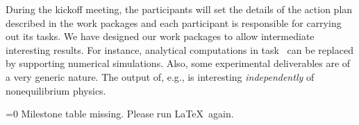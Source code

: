 During the kickoff meeting, the participants will set the details of the action plan
described in the work packages and each participant is responsible for carrying out its
tasks.
%
We have designed our work packages to allow intermediate interesting results. For instance,
analytical computations in task~ can be replaced by
supporting numerical simulations.
%
Also, some experimental deliverables are of a very generic nature. The output of, e.g.,
 is interesting {\em independently} of nonequilibrium
physics.

\makeatletter
\ifnum{}=0
Milestone table missing. Please run \LaTeX\ again.%
\else%
\milestonetable%
\fi
\makeatother
